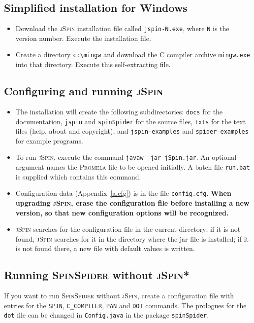 \documentclass[11pt]{article}
\newcommand{\prm}{\textsc{Promela}}
\newcommand{\js}{\textsc{jSpin}}
\newcommand{\spd}{\textsc{SpinSpider}}
\newcommand{\dtf}{\texttt{dot}}
\newcommand{\p}[1]{\texttt{#1}}
\begin{document}
\subsection{Simplified installation for Windows}
\begin{itemize}
\item Download the \js{} installation file called \p{jspin-N.exe},
where \p{N} is the version number.
Execute the installation file.
\item Create a directory \verb=c:\mingw= and download the C 
compiler archive \p{mingw.exe} into that directory. Execute this self-extracting file.
\end{itemize}

\subsection{Configuring and running \js{}}
\begin{itemize}
\item The installation will create the following subdirectories: \p{docs} for the
documentation, \p{jspin} and \p{spinSpider} for the source files, 
\p{txts} for the text files
(help, about and copyright), and \p{jspin-examples} and \p{spider-examples}
for example programs.
\item To run \js{}, execute the command \p{javaw -jar jSpin.jar}.
An optional argument names the \prm{} file to be opened initially.
A batch file \p{run.bat} is supplied which contains this command.
\item Configuration data (Appendix~\ref{a.cfg}) is in the file
\p{config.cfg}.
\textbf{When upgrading \js{}, erase the configuration file before installing
a new version, so that new configuration options will be recognized.}
\item \js{} searches for the configuration file in the current
directory; if it is not found, \js{} searches for it in the directory
where the jar file is installed; if it is not found there, a new file
with default values is written.
\end{itemize}

\subsection{Running \spd{} without \js{}*}
If you want to run \spd{} without \js{}, create a configuration file
with entries for the \p{SPIN}, \p{C\_COMPILER}, \p{PAN} and \p{DOT}
commands. The prologues for the \dtf{} file can be changed in
\p{Config.java} in the package \p{spinSpider}.
\end{document}
